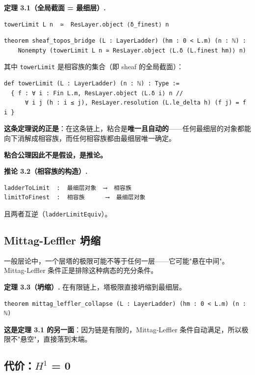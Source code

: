 \documentclass[11pt,a4paper]{ctexart}
\begin{document}
\textbf{定理 3.1（全局截面 = 最细层）.}

\begin{lstlisting}
towerLimit L n  ≃  ResLayer.object ⟨δ_finest⟩ n
\end{lstlisting}

\begin{lstlisting}
theorem sheaf_topos_bridge (L : LayerLadder) (hm : 0 < L.m) (n : ℕ) :
    Nonempty (towerLimit L n ≃ ResLayer.object ⟨L.δ (L.finest hm)⟩ n)
\end{lstlisting}

其中 \texttt{towerLimit} 是相容族的集合（即 sheaf 的全局截面）：

\begin{lstlisting}
def towerLimit (L : LayerLadder) (n : ℕ) : Type :=
  { f : ∀ i : Fin L.m, ResLayer.object ⟨L.δ i⟩ n //
      ∀ i j (h : i ≤ j), ResLayer.resolution (L.le_delta h) (f j) = f i }
\end{lstlisting}

\textbf{这条定理说的正是}：在这条链上，粘合是\textbf{唯一且自动的}——任何最细层的对象都能向下消解成相容族，而任何相容族都由最细层唯一确定。

\textbf{粘合公理因此不是假设，是推论。}

\textbf{推论 3.2（相容族的构造）.}

\begin{lstlisting}
ladderToLimit  :  最细层对象  ⟶  相容族
limitToFinest  :  相容族      ⟶  最细层对象
\end{lstlisting}

且两者互逆（\texttt{ladderLimitEquiv}）。

\subsection{Mittag-Leffler 坍缩}

一般层论中，一个层塔的极限可能不等于任何一层——它可能"悬在中间"。Mittag-Leffler 条件正是排除这种病态的充分条件。

\textbf{定理 3.3（坍缩）.} 在有限链上，塔极限直接坍缩到最细层。

\begin{lstlisting}
theorem mittag_leffler_collapse (L : LayerLadder) (hm : 0 < L.m) (n : ℕ)
\end{lstlisting}

\textbf{这是定理 3.1 的另一面}：因为链是有限的，Mittag-Leffler 条件自动满足，所以极限不"悬空"，直接落到末端。

\subsection{代价：\ensuremath{H^{1}} = 0}
\end{document}
